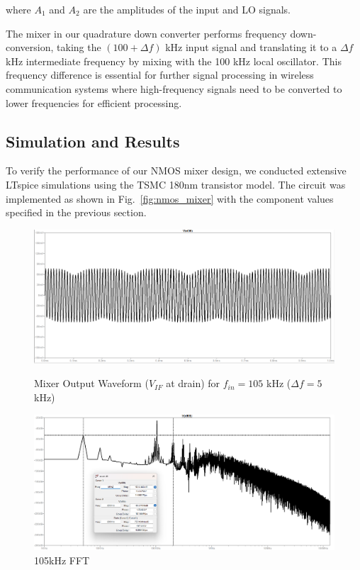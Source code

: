 where $A_1$ and $A_2$ are the amplitudes of the input and LO signals.

The mixer in our quadrature down converter performs frequency down-conversion, taking the $(100 + \Delta f)$ kHz input signal and translating it to a $\Delta f$ kHz intermediate frequency by mixing with the 100 kHz local oscillator. This frequency difference is essential for further signal processing in wireless communication systems where high-frequency signals need to be converted to lower frequencies for efficient processing.

\subsection{Simulation and Results}

To verify the performance of our NMOS mixer design, we conducted extensive LTspice simulations using the TSMC 180nm transistor model. The circuit was implemented as shown in Fig.~\ref{fig:nmos_mixer} with the component values specified in the previous section.

\begin{figure}[H]
    \centering
    \includegraphics[width=\linewidth]{fig/105.png}
    \caption{Mixer Output Waveform ($V_{IF}$ at drain) for $f_{in} = 105$ kHz ($\Delta f = 5$ kHz)}
    \includegraphics[width=1\linewidth]{fig/105fft.png}
     \caption{105kHz FFT}
    \label{fig:mixer_output}
\end{figure}

